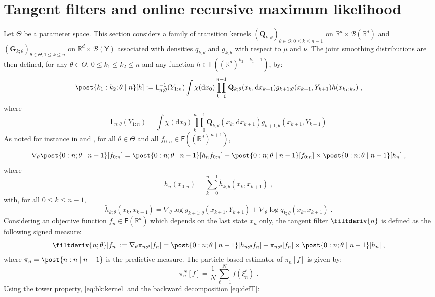 \documentclass{article}
\def\Xset{\mathbb{R}^d}
\def\Yset{\mathsf{Y}}
\newcommand{\mk}{\kernel{G}}
\newcommand{\hk}{\kernel{Q}}
\newcommand{\md}[1]{g_{#1}}
\newcommand{\llh}[1]{\mathsf{L}_{#1}}
\newcommand{\pred}[1]{\pi_{#1}}
\newcommand{\parvec}{\theta}
\newcommand{\parspace}{\Theta}
\newcommand{\af}[1]{h_{#1}}
\newcommand{\deriv}{\nabla_{\parvec}}
\newcommand{\kernel}[1]{\mathbf{#1}}
\newcommand{\bmf}[1]{\set{F}(#1)}
\newcommand{\set}[1]{\mathsf{#1}}
\newcommand{\hd}[1]{q_{#1}}
\newcommand{\addf}[1]{\termletter_{#1}}
\newcommand{\termletter}{\tilde{h}}
\newcommand{\rmd}{\ensuremath{\mathrm{d}}}
\newcommand{\eqdef}{\ensuremath{:=}}
\newcommand{\eqsp}{\;}
\newcommand{\epart}[2]{\ensuremath{\xi_{#1}^{#2}}}
\begin{document}
\section{Tangent filters and online recursive maximum likelihood}
\label{sec:tangent:filter}
Let $\parspace$ be a parameter space. 
This section considers a family of transition kernels $(\hk_{k;\parvec})_{\parvec\in\parspace; 0\leqslant k \leqslant n-1}$ on $\Xset\times \mathcal{B}(\Xset)$ and $(\mk_{k;\parvec})_{\parvec\in\parspace;1\leqslant k \leqslant n}$ on $\Xset\times \mathcal{B}(\Yset)$ associated with densities $\hd{k;\parvec}$ and $\md{k;\parvec}$ with respect to $\mu$ and  $\nu$. 
The joint smoothing distributions are then defined, for any $\parvec\in\parspace$, $0 \leqslant k_1 \leqslant k_2 \leqslant n$ and any function $h\in \bmf{(\Xset)^{k_2 - k_1 +1}}$,  by:
\[
\post{k_1:k_2;\parvec \mid n}[h] \eqdef \llh{n;\parvec}^{-1}(Y_{1:n})\int \chi(\rmd x_0)\prod_{k=0}^{n-1}\hk_{k;\parvec}(x_{k},\rmd x_{k+1})\md{k+1;\parvec}(x_{k+1},Y_{k+1})h(x_{k_1:k_2})\eqsp,
\]
where
\[
\llh{n;\parvec}(Y_{1:n})  = \int \chi(\rmd x_0)\prod_{k=0}^{n-1}\hk_{k;\parvec}(x_{k},\rmd x_{k+1})\md{k+1;\parvec}(x_{k+1},Y_{k+1})
\]
As noted for instance in \cite[Section~2]{delmoral:doucet:singh:2015} and \cite{olsson:westerborn:2017}, for all $\parvec\in\parspace$ and all $f_{0:n}\in \bmf{(\Xset)^{n+1}}$,
\[
\deriv \post{0:n;\parvec \mid n - 1}[f_{0:n}]  = \post{0:n;\parvec \mid n - 1} [\af{n} f_{0:n}] - \post{0:n;\parvec \mid n - 1} [f_{0:n}] \times \post{0:n;\parvec \mid n - 1 }[\af{n}]\eqsp,
\]
where
\begin{equation*}
\af{n}(x_{0:n}) = \sum_{k=0}^{n-1}\addf{k;\parvec}(x_{k},x_{k+1})\eqsp,
\end{equation*}
with, for all $0\leqslant k \leqslant n-1$,
\[
\addf{k;\parvec}(x_{k},x_{k+1}) = \nabla_{\parvec}\log \md{k+1;\parvec}(x_{k+1},Y_{k+1}) + \nabla_{\parvec}\log \hd{k;\parvec}(x_k,x_{k+1})\eqsp.
\]
Considering an objective function $f_{n}\in \bmf{\Xset}$ which depends on the last state $x_n$ only, the tangent filter $\filtderiv{n}$ is defined as the following signed measure: 
$$
\filtderiv{n;\parvec}[f_n] \eqdef \deriv \pred{n;\parvec}[f_n] = \post{0:n;\parvec \mid n - 1} [\af{n;\parvec} f_{n}] - \pred{n;\parvec}[f_{n}] \times \post{0:n;\parvec \mid n - 1 }[\af{n}]\eqsp, 
$$
where $\pred{n}=\post{n:n\mid n - 1}$ is the predictive measure. 
The particle based estimator of $\pred{n}[f]$ is given by:
$$\pred{n}^N[f] = \frac{1}{N}\sum_{\ell = 1}^N f(\epart{n}{\ell})\eqsp.$$
Using the tower property, \eqref{eq:bk:kernel} and the backward decomposition \eqref{eq:defT}:
\end{document}
